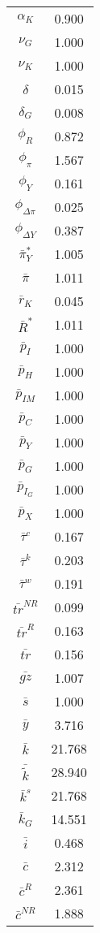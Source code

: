 \begin{center}
\begin{longtable}{cc}
$\alpha_K$ 	 & 	 0.900 \\
$\nu_G$ 	 & 	 1.000 \\
$\nu_K$ 	 & 	 1.000 \\
$\delta$ 	 & 	 0.015 \\
$\delta_G$ 	 & 	 0.008 \\
$\phi_R$ 	 & 	 0.872 \\
$\phi_{\pi}$ 	 & 	 1.567 \\
$\phi_Y$ 	 & 	 0.161 \\
$\phi_{\Delta\pi}$ 	 & 	 0.025 \\
$\phi_{\Delta Y}$ 	 & 	 0.387 \\
$\bar{\pi}_Y^*$ 	 & 	 1.005 \\
$\bar{\pi}$ 	 & 	 1.011 \\
$\bar{r}_K$ 	 & 	 0.045 \\
$\bar{R}^*$ 	 & 	 1.011 \\
$\bar{p}_I$ 	 & 	 1.000 \\
$\bar{p}_H$ 	 & 	 1.000 \\
$\bar{p}_{IM}$ 	 & 	 1.000 \\
$\bar{p}_C$ 	 & 	 1.000 \\
$\bar{p}_Y$ 	 & 	 1.000 \\
$\bar{p}_G$ 	 & 	 1.000 \\
$\bar{p}_{I_G}$ 	 & 	 1.000 \\
$\bar{p}_X$ 	 & 	 1.000 \\
$\bar{\tau}^c$ 	 & 	 0.167 \\
$\bar{\tau}^k$ 	 & 	 0.203 \\
$\bar{\tau}^w$ 	 & 	 0.191 \\
$\bar{tr}^{NR}$ 	 & 	 0.099 \\
$\bar{tr}^{R}$ 	 & 	 0.163 \\
$\bar{tr}$ 	 & 	 0.156 \\
$\bar{gz}$ 	 & 	 1.007 \\
$\bar{s}$ 	 & 	 1.000 \\
$\bar{y}$ 	 & 	 3.716 \\
$\bar{k}$ 	 & 	 21.768 \\
$\bar{\tilde{k}}$ 	 & 	 28.940 \\
$\bar{k}^s$ 	 & 	 21.768 \\
$\bar{k}_G$ 	 & 	 14.551 \\
$\bar{i}$ 	 & 	 0.468 \\
$\bar{c}$ 	 & 	 2.312 \\
$\bar{c}^R$ 	 & 	 2.361 \\
$\bar{c}^{NR}$ 	 & 	 1.888 \\

\end{longtable}
\end{center}
